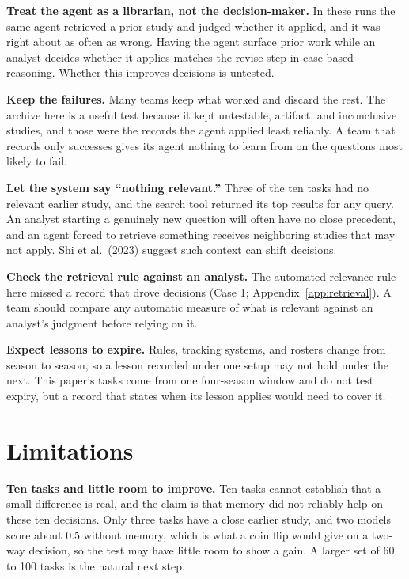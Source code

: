 \documentclass[11pt]{article}
\begin{document}
\textbf{Treat the agent as a librarian, not the decision-maker.} In these runs the same agent retrieved a prior study and judged whether it applied, and it was right about as often as wrong. Having the agent surface prior work while an analyst decides whether it applies matches the revise step in case-based reasoning. Whether this improves decisions is untested.

\textbf{Keep the failures.} Many teams keep what worked and discard the rest. The archive here is a useful test because it kept untestable, artifact, and inconclusive studies, and those were the records the agent applied least reliably. A team that records only successes gives its agent nothing to learn from on the questions most likely to fail.

\textbf{Let the system say ``nothing relevant.''} Three of the ten tasks had no relevant earlier study, and the search tool returned its top results for any query. An analyst starting a genuinely new question will often have no close precedent, and an agent forced to retrieve something receives neighboring studies that may not apply. Shi et al.\ (2023) suggest such context can shift decisions.

\textbf{Check the retrieval rule against an analyst.} The automated relevance rule here missed a record that drove decisions (Case 1; Appendix~\ref{app:retrieval}). A team should compare any automatic measure of what is relevant against an analyst's judgment before relying on it.

\textbf{Expect lessons to expire.} Rules, tracking systems, and rosters change from season to season, so a lesson recorded under one setup may not hold under the next. This paper's tasks come from one four-season window and do not test expiry, but a record that states when its lesson applies would need to cover it.

\section{Limitations}
\label{sec:limits}

\textbf{Ten tasks and little room to improve.} Ten tasks cannot establish that a small difference is real, and the claim is that memory did not reliably help on these ten decisions. Only three tasks have a close earlier study, and two models score about 0.5 without memory, which is what a coin flip would give on a two-way decision, so the test may have little room to show a gain. A larger set of 60 to 100 tasks is the natural next step.
\end{document}
